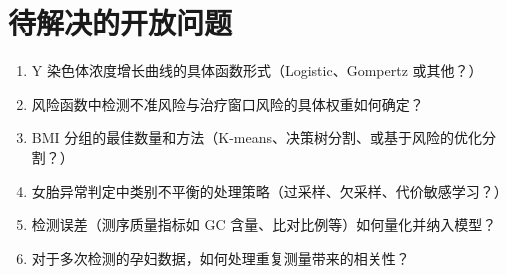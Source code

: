 \documentclass{internal-report}
\begin{document}
\section{待解决的开放问题}

\begin{enumerate}
  \item Y 染色体浓度增长曲线的具体函数形式（Logistic、Gompertz 或其他？）
  \item 风险函数中检测不准风险与治疗窗口风险的具体权重如何确定？
  \item BMI 分组的最佳数量和方法（K-means、决策树分割、或基于风险的优化分割？）
  \item 女胎异常判定中类别不平衡的处理策略（过采样、欠采样、代价敏感学习？）
  \item 检测误差（测序质量指标如 GC 含量、比对比例等）如何量化并纳入模型？
  \item 对于多次检测的孕妇数据，如何处理重复测量带来的相关性？
\end{enumerate}
\end{document}
